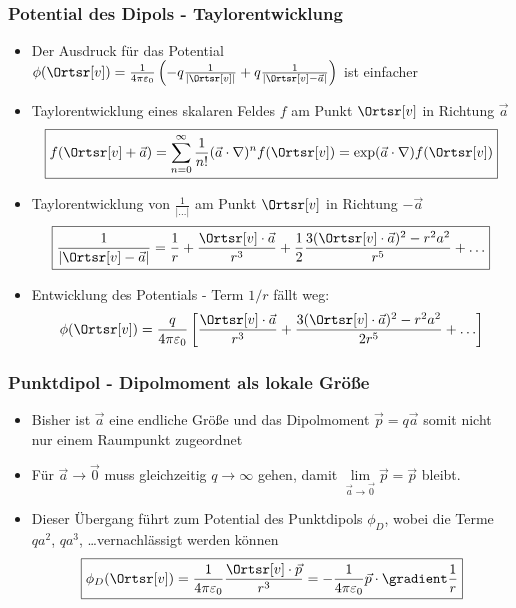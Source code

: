 \begin{frame}
\begin{columns}[T]
\begin{column}{.7\linewidth}
    \vspace*{-.3cm}\ 
    \onslide<4->{\centering{\resizebox{.7\columnwidth}{!}{ } }} 
      \end{column}
\end{columns}
\end{frame}

\begin{frame}
  \frametitle{Potential des Dipols - Taylorentwicklung}
\begin{itemize}[<+->]
\item Der Ausdruck für das Potential $\phi (\Ortsr[v]) =  \frac{1}{4\pi\varepsilon_0} \left( -q\frac{1}{|\Ortsr[v]|}  + q\frac{1}{|\Ortsr[v]-\vec{a}|} \right)$ ist einfacher
\item \alert{Taylorentwicklung} eines skalaren Feldes $f$ am Punkt $\Ortsr[v]$ in Richtung $\vec{a}$
  $$
\boxed{  f(\Ortsr[v]+\vec{a}) = \sum_{n=0}^\infty \frac{1}{n!} (\vec{a} \cdot \nabla)^n f(\Ortsr[v]) = \exp(\vec{a} \cdot \nabla) f(\Ortsr[v]) } 
  $$
\item \alert{Taylorentwicklung} von $\frac{1}{|\dots|}$ am Punkt $\Ortsr[v]$ in Richtung $-\vec{a}$
  $$
  \boxed{\frac{1}{|\Ortsr[v]-\vec{a}|} = \frac{1}{r} + \frac{\Ortsr[v]\cdot\vec{a}}{r^3} + \frac{1}{2} \frac{3(\Ortsr[v]\cdot\vec{a})^2-r^2a^2}{r^5} + \ldots }
  $$
\item Entwicklung des Potentials - Term $1/r$ fällt weg:
  $$
  \phi (\Ortsr[v]) =  \frac{q}{4\pi\varepsilon_0} \left[ \frac{\Ortsr[v]\cdot\vec{a}}{r^3} + \frac{3(\Ortsr[v]\cdot\vec{a})^2-r^2a^2}{2r^5} + \ldots \right] 
  $$
  
\end{itemize}
\end{frame}

\begin{frame}
  \frametitle{Punktdipol - Dipolmoment als lokale Größe}
  \begin{itemize}[<+->]
  \item Bisher ist $\vec{a}$ eine endliche Größe und das Dipolmoment $\vec{p} = q \vec{a}$ somit nicht nur einem Raumpunkt zugeordnet
  \item Für $\vec{a}\to \vec{0}$ muss gleichzeitig $q\to\infty$ gehen, damit $\lim \limits_{\vec{a}\to \vec{0}}\vec{p} =\vec{p}$ bleibt.
  \item Dieser Übergang führt zum \alert{Potential des Punktdipols} $\phi_D$, wobei die Terme $qa^2$, $qa^3$, \dots vernachlässigt werden können
    $$
    \boxed{\phi_D(\Ortsr[v]) = \frac{1}{4\pi\varepsilon_0} \frac{\Ortsr[v]\cdot\vec{p}}{r^3} = -\frac{1}{4\pi\varepsilon_0} \vec{p}\cdot\gradient \frac{1}{r} }
    $$
    \end{itemize}
  \end{frame}

